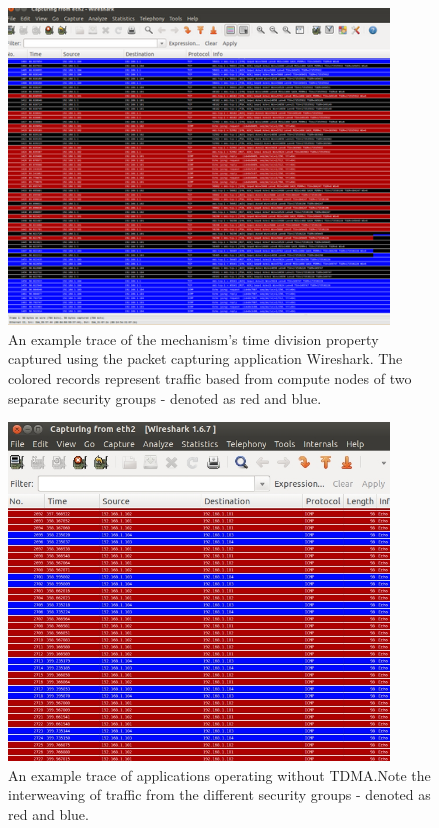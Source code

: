 \documentclass[oneside,12pt]{memoir}
\begin{document}
    
\begin{figure}
  \begin{center}
    \includegraphics[width=0.9\textwidth]{wireshark.jpg}
  \end{center}
  \caption{An example trace of the mechanism's time division property captured using the packet capturing application Wireshark. The colored records represent traffic based from compute nodes of two separate security groups - denoted as red and blue.}
\label{fig:wireshark}
\end{figure}

\begin{figure}
  \begin{center}
    \includegraphics[width=0.9\textwidth]{wireshark_random.jpg}
  \end{center}
  \caption{An example trace of applications operating without TDMA.Note the interweaving of traffic from the different security groups - denoted as red and blue.}
\label{fig:wireshark_random}
\end{figure}
\end{document}

